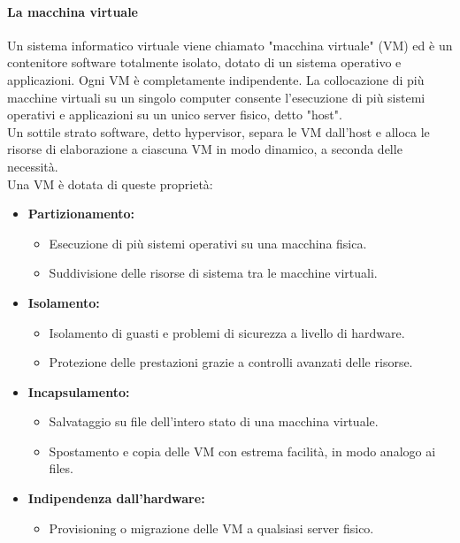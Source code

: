 \documentclass[a4paper]{report}
\begin{document}
\paragraph{La macchina virtuale} Un sistema informatico virtuale viene chiamato "macchina virtuale" (VM) ed è un contenitore software totalmente isolato, dotato di un sistema operativo e applicazioni. Ogni VM è completamente indipendente. La collocazione di più macchine virtuali su un singolo computer consente l'esecuzione di più sistemi operativi e applicazioni su un unico server fisico, detto "host".\\
Un sottile strato software, detto hypervisor, separa le VM dall'host e alloca le risorse di elaborazione a ciascuna VM in modo dinamico, a seconda delle necessità.\\
Una VM è dotata di queste proprietà:
\begin{itemize}
\item \textbf{Partizionamento:}
	\begin{itemize}
	\item Esecuzione di più sistemi operativi su una macchina fisica.
	\item Suddivisione delle risorse di sistema tra le macchine virtuali.
	\end{itemize}
\item \textbf{Isolamento:}
	\begin{itemize}
	\item Isolamento di guasti e problemi di sicurezza a livello di hardware.
	\item Protezione delle prestazioni grazie a controlli avanzati delle risorse.
	\end{itemize}
\item \textbf{Incapsulamento:}
	\begin{itemize}
	\item Salvataggio su file dell'intero stato di una macchina virtuale.
	\item Spostamento e copia delle VM con estrema facilità, in modo analogo ai files.
	\end{itemize}
\item \textbf{Indipendenza dall'hardware:}
	\begin{itemize}
	\item Provisioning o migrazione delle VM a qualsiasi server fisico.
	\end{itemize}
\end{itemize}
\end{document}
